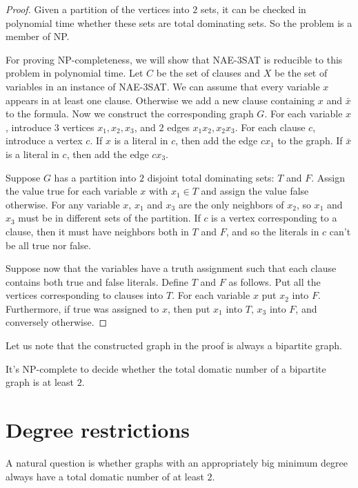 \begin{proof}
  Given a partition of the vertices into $2$ sets, it can be checked in polynomial
  time whether these sets are total dominating sets. So the problem is a member
  of NP.

  For proving NP-completeness, we will show that NAE-3SAT is reducible to this problem
  in polynomial time. Let $C$ be the set of clauses and $X$ be the set of variables
  in an instance of NAE-3SAT. We can assume that every variable $x$ appears in at least
  one clause. Otherwise we add a new clause containing $x$ and $\bar{x}$ to
  the formula. Now we construct the corresponding graph $G$. For each variable $x$,
  introduce $3$ vertices $x_1, x_2, x_3$, and $2$ edges $x_1x_2, x_2x_3$. For each
  clause $c$, introduce a vertex $c$. If $x$ is a literal in $c$, then add the edge
  $cx_1$ to the graph. If $\bar{x}$ is a literal in $c$, then add the edge $cx_3$.

  Suppose $G$ has a partition into $2$ disjoint total dominating sets: $T$ and $F$.
  Assign the value true for each variable $x$ with $x_1 \in T$ and assign the value
  false otherwise. For any variable $x$, $x_1$ and $x_3$ are the only neighbors
  of $x_2$, so $x_1$ and $x_3$ must be in different sets of the partition. If $c$
  is a vertex corresponding to a clause, then it must have neighbors both in $T$
  and $F$, and so the literals in $c$ can't be all true nor false.

  Suppose now that the variables have a truth assignment such that each clause
  contains both true and false literals. Define $T$ and $F$ as follows. Put all
  the vertices corresponding to clauses into $T$. For each variable $x$ put $x_2$
  into $F$. Furthermore, if true was assigned to $x$, then put $x_1$ into $T$, $x_3$
  into $F$, and conversely otherwise.
\end{proof}

Let us note that the constructed graph in the proof is always a bipartite
graph.

\begin{cor}
  It's NP-complete to decide whether the total domatic number of
  a bipartite graph is at least $2$.
\end{cor}


\section{Degree restrictions}

A natural question is whether graphs with an appropriately big minimum degree
always have a total domatic number of at least $2$.

